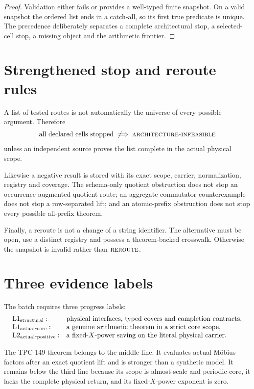 \documentclass[11pt]{article}
\theoremstyle{definition}
\theoremstyle{remark}
\newcommand{\Lone}{\mathrm{L1}}
\newcommand{\Ltwo}{\mathrm{L2}}
\newcommand{\AINF}{\textnormal{\textsc{architecture-infeasible}}}
\newcommand{\REROUTE}{\textnormal{\textsc{reroute}}}
\begin{document}
\begin{proof}
Validation either fails or provides a well-typed finite snapshot.
On a valid snapshot the ordered list ends in a catch-all, so its first
true predicate is unique.  The precedence deliberately separates a
complete architectural stop, a selected-cell stop, a missing object
and the arithmetic frontier.
\end{proof}

\section{Strengthened stop and reroute rules}

A list of tested routes is not automatically the universe of every
possible argument.  Therefore
\[
 \text{all declared cells stopped}
 \;\not\Longrightarrow\;
 \AINF
\]
unless an independent source proves the list complete in the actual
physical scope.

Likewise a negative result is stored with its exact scope, carrier,
normalization, registry and coverage.  The schema-only quotient
obstruction does not stop an occurrence-augmented quotient route; an
aggregate-commutator counterexample does not stop a row-separated
lift; and an atomic-prefix obstruction does not stop every possible
all-prefix theorem.

Finally, a reroute is not a change of a string identifier.  The
alternative must be open, use a distinct registry and possess a
theorem-backed crosswalk.  Otherwise the snapshot is invalid rather
than \(\REROUTE\).

\section{Three evidence labels}

The batch requires three progress labels:
\[
\begin{array}{ll}
\Lone_{\rm structural}:&
 \text{physical interfaces, typed covers and completion contracts},\\
\Lone_{\rm actual\mbox{-}core}:&
 \text{a genuine arithmetic theorem in a strict core scope},\\
\Ltwo_{\rm actual\mbox{-}positive}:&
 \text{a fixed-\(X\)-power saving on the literal physical carrier}.
\end{array}
\]

The TPC-149 theorem belongs to the middle line.  It evaluates actual
M\"obius factors after an exact quotient lift and is stronger than a
synthetic model.  It remains below the third line because its scope is
almost-scale and periodic-core, it lacks the complete physical return,
and its fixed-\(X\)-power exponent is zero.
\end{document}
